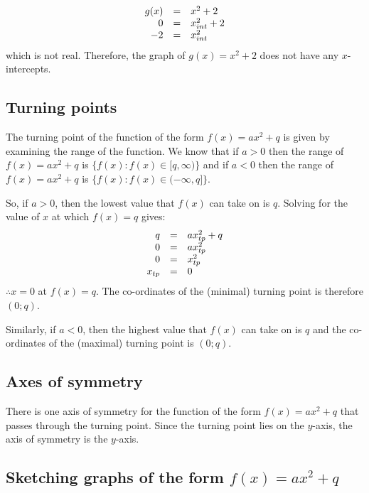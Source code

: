 \begin{equation*}
\begin{array}{ccc}\hfill g(x)& =& {x}^{2}+2\hfill \\
 \hfill 0& =& x_{int}^{2}+2\hfill \\
 \hfill -2& =& x_{int}^{2}\hfill 
\end{array}
\end{equation*}
which is not real. Therefore, the graph of $g(x)={x}^{2}+2$ does not have any $x$-intercepts. 

\subsection*{Turning points}

The turning point of the function of the form $f(x)=a{x}^{2}+q$ is given by examining the range of the function. We know that if $a>0$ then the range of $f(x)=a{x}^{2}+q$ is $\{f(x):f(x)\in [q,\infty )\}$ and if $a<0$ then the range of $f(x)=a{x}^{2}+q$ is $\{f(x):f(x)\in (-\infty ,q]\}$.\par 
So, if $a>0$, then the lowest value that $f(x)$ can take on is $q$. Solving for the value of $x$ at which $f(x)=q$ gives:
\begin{equation*}
\begin{array}{ccc}\hfill q& =& ax_{tp}^{2}+q\hfill \\
 \hfill 0& =& ax_{tp}^{2}\hfill \\
 \hfill 0& =& x_{tp}^{2}\hfill \\
 \hfill {x}_{tp}& =& 0\hfill 
\end{array}
\end{equation*}
$\therefore x=0$ at $f(x)=q$. The co-ordinates of the (minimal) turning point is therefore $(0;q)$.\par 
Similarly, if $a<0$, then the highest value that $f(x)$ can take on is $q$ and the co-ordinates of the (maximal) turning point is $(0;q)$.
\subsection*{Axes of symmetry}

There is one axis of symmetry for the function of the form $f(x)=a{x}^{2}+q$ that passes through the turning point. Since the turning point lies on the $y$-axis, the axis of symmetry is the $y$-axis.\par 

\subsection*{Sketching graphs of the form $f(x)=a{x}^{2}+q$}

